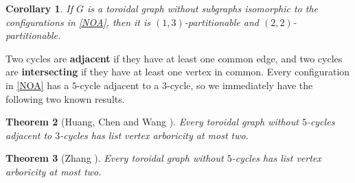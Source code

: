 \documentclass{article}
\newtheorem{theorem}{Theorem}[section]
\newtheorem{corollary}[theorem]{Corollary}
\theoremstyle{definition}
\begin{document}
\begin{corollary}
If $G$ is a toroidal graph without subgraphs isomorphic to the configurations in \autoref{NOA}, then it is $(1, 3)$-partitionable and $(2, 2)$-partitionable. 
\end{corollary}

Two cycles are \textbf{adjacent} if they have at least one common edge, and two cycles are \textbf{intersecting} if they have at least one vertex in common. Every configuration in \autoref{NOA} has a $5$-cycle adjacent to a $3$-cycle, so we immediately have the following two known results. 
\begin{theorem}[Huang, Chen and Wang \cite{MR3320048}]
Every toroidal graph without $5$-cycles adjacent to $3$-cycles has list vertex arboricity at most two.
\end{theorem}
\begin{theorem}[Zhang \cite{MR3570576}]
Every toroidal graph without $5$-cycles has list vertex arboricity at most two.
\end{theorem}
\end{document}
